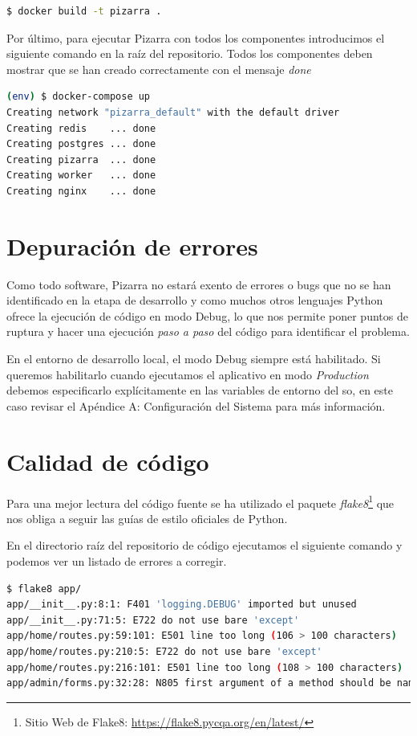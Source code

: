 \documentclass[11pt,spanish,listoffigures,listoftables]{tfgetsinf}
\begin{document}
\begin{lstlisting}[language=bash]
$ docker build -t pizarra .
\end{lstlisting}

Por último, para ejecutar Pizarra con todos los componentes introducimos el siguiente comando en la raíz del repositorio. Todos los componentes deben mostrar que se han creado correctamente con el mensaje \textit{done}

\begin{lstlisting}[language=bash]
(env) $ docker-compose up
Creating network "pizarra_default" with the default driver
Creating redis    ... done
Creating postgres ... done
Creating pizarra  ... done
Creating worker   ... done
Creating nginx    ... done
\end{lstlisting}

\section{Depuración de errores}

Como todo software, Pizarra no estará exento de errores o \foreignlanguage{english}{bugs} que no se han identificado en la etapa de desarrollo y como muchos otros lenguajes Python ofrece la ejecución de código en modo Debug, lo que nos permite poner puntos de ruptura y hacer una ejecución \textit{paso a paso} del código para identificar el problema.

En el entorno de desarrollo local, el modo Debug siempre está habilitado. Si queremos habilitarlo cuando ejecutamos el aplicativo en modo \textit{Production} debemos especificarlo explícitamente en las variables de entorno del \acrshort{so}, en este caso revisar el Apéndice A: Configuración del Sistema para más información.

\section{Calidad de código}

Para una mejor lectura del código fuente se ha utilizado el \Gls{paquete} \textit{flake8}\footnote{Sitio Web de Flake8: \url{https://flake8.pycqa.org/en/latest/}} que nos obliga a seguir las guías de estilo oficiales de Python.

En el directorio raíz del repositorio de código ejecutamos el siguiente comando y podemos ver un listado de errores a corregir.

\begin{lstlisting}[language=bash]
$ flake8 app/
app/__init__.py:8:1: F401 'logging.DEBUG' imported but unused
app/__init__.py:71:5: E722 do not use bare 'except'
app/home/routes.py:59:101: E501 line too long (106 > 100 characters)
app/home/routes.py:210:5: E722 do not use bare 'except'
app/home/routes.py:216:101: E501 line too long (108 > 100 characters)
app/admin/forms.py:32:28: N805 first argument of a method should be named 'self'
\end{lstlisting}
\end{document}

